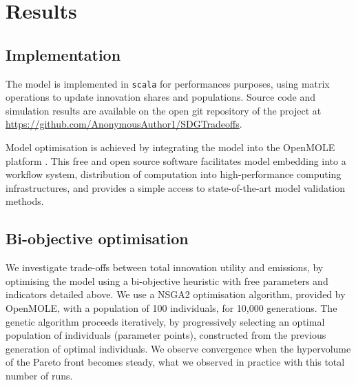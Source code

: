 \documentclass[final,5p,times,twocolumn,authoryear]{elsarticle}
\begin{document}
\section{Results}

\subsection{Implementation}

The model is implemented in \texttt{scala} for performances purposes, using matrix operations to update innovation shares and populations. Source code and simulation results are available on the open git repository of the project at \url{https://github.com/AnonymousAuthor1/SDGTradeoffs}.

Model optimisation is achieved by integrating the model into the OpenMOLE platform \citep{reuillon2013openmole}. This free and open source software facilitates model embedding into a workflow system, distribution of computation into high-performance computing infrastructures, and provides a simple access to state-of-the-art model validation methods.


\subsection{Bi-objective optimisation}

We investigate trade-offs between total innovation utility and emissions, by optimising the model using a bi-objective heuristic with free parameters and indicators detailed above. We use a NSGA2 optimisation algorithm, provided by OpenMOLE, with a population of 100 individuals, for 10,000 generations. The genetic algorithm proceeds iteratively, by progressively selecting an optimal population of individuals (parameter points), constructed from the previous generation of optimal individuals. We observe convergence when the hypervolume of the Pareto front becomes steady, what we observed in practice with this total number of runs.
\end{document}
